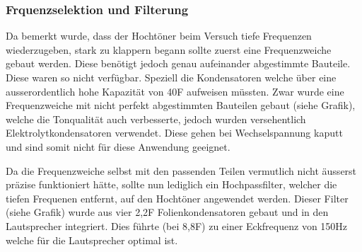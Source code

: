\documentclass[a4paper,11pt]{report}
\begin{document}
\subsubsection*{Frquenzselektion und Filterung}
Da bemerkt wurde, dass der Hochtöner beim Versuch tiefe Frequenzen wiederzugeben, stark zu klappern begann sollte zuerst eine Frequenzweiche gebaut werden. Diese benötigt jedoch genau aufeinander abgestimmte Bauteile. Diese waren so nicht verfügbar. Speziell die Kondensatoren welche über eine ausserordentlich hohe Kapazität von 40\mu F aufweisen müssten. Zwar wurde eine Frequenzweiche mit nicht perfekt abgestimmten Bauteilen gebaut (siehe Grafik), welche die Tonqualität auch verbesserte, jedoch wurden versehentlich Elektrolytkondensatoren verwendet. Diese gehen bei Wechselspannung kaputt und sind somit nicht für diese Anwendung geeignet. 

Da die Frequenzweiche selbst mit den passenden Teilen vermutlich nicht äusserst präzise funktioniert hätte, sollte nun lediglich ein Hochpassfilter, welcher die tiefen Frequenen entfernt, auf den Hochtöner angewendet werden. Dieser Filter (siehe Grafik) wurde aus vier 2,2\mu F Folienkondensatoren gebaut und in den Lautsprecher integriert. Dies führte (bei 8,8\mu F) zu einer Eckfrequenz von 150Hz welche für die Lautsprecher optimal ist. 
\end{document}

